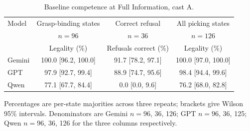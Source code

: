 \begin{table}[H]
  \centering
  \caption{Baseline competence at Full Information, cast A.}
  \label{tab:ex1:baseline}
  \small
  \begin{tabular}{@{}lccc@{}}
    \toprule
    Model & Grasp-binding states & Correct refusal & All picking states \\
          & $n=96$               & $n=36$          & $n=126$ \\
          & Legality (\%)        & Refusals correct (\%) & Legality (\%) \\
    \midrule
    Gemini & 100.0 [96.2, 100.0] & 91.7 [78.2, 97.1] & 100.0 [97.0, 100.0] \\
    GPT & 97.9 [92.7, 99.4] & 88.9 [74.7, 95.6] & 98.4 [94.4, 99.6] \\
    Qwen & 77.1 [67.7, 84.4] & 0.0 [0.0, 9.6] & 76.2 [68.0, 82.8] \\
    \bottomrule
  \end{tabular}
  \begin{minipage}{0.94\linewidth}\vspace{2pt}\footnotesize
    Percentages are per-state majorities across three repeats; brackets give Wilson 95\% intervals. Denominators are Gemini $n=96$, 36, 126; GPT $n=96$, 36, 125; Qwen $n=96$, 36, 126 for the three columns respectively.
  \end{minipage}
\end{table}
